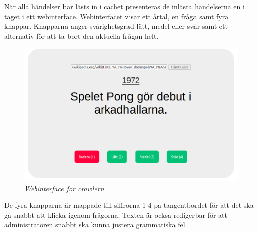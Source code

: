 \documentclass[a4paper, 11pt]{article}
\begin{document}
När alla  händelser har lästs in i cachet presenteras de inlästa händelserna en i taget i ett webinterface. Webinterfacet visar ett årtal, en fråga samt fyra knappar. Knapparna anger svårighetsgrad lätt, medel eller svår samt ett alternativ för att ta bort den aktuella frågan helt.

\begin{figure}[H]
	\begin{centering}
	\includegraphics[width=\textwidth]{crawler} 
	\end{centering}
	\caption{\textit{Webinterface för crawlern}}
\end{figure}

De fyra knapparna är mappade till siffrorna 1-4 på tangentbordet för att det ska gå snabbt att klicka igenom frågorna. Texten är också redigerbar för att administratören snabbt ska kunna justera grammatiska fel.
\end{document}

